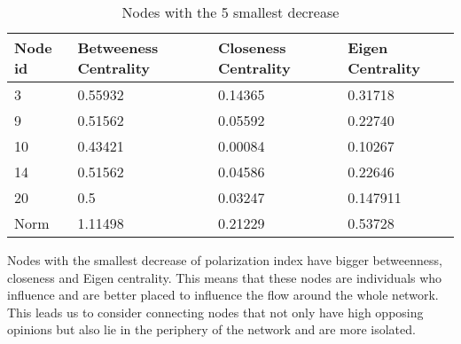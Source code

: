 \begin{table}[t]
 \centering
 \caption{Nodes with the 5 smallest decrease}
 \label{tab:nodesSmallest}
 \begin{tabular}{| l || l | l | l |}
 \hline
  Node id & Betweeness Centrality& Closeness Centrality & Eigen Centrality\\
  \hline
  \hline
  3 & 0.55932 & 0.14365 & 0.31718\\
  \hline
  9 & 0.51562 & 0.05592 & 0.22740\\
  \hline
  10 & 0.43421 & 0.00084 &  0.10267\\
  \hline
  14 & 0.51562 & 0.04586 & 0.22646\\
  \hline
  20 & 0.5 & 0.03247 & 0.147911\\
  \hline
  \hline
    Norm & 1.11498 & 0.21229 & 0.53728\\ 
  \hline
 \end{tabular}
\end{table}


Nodes with the smallest decrease of polarization index have bigger betweenness, closeness and Eigen centrality. This means that these nodes are individuals who influence and are better placed to influence the flow around the whole network. This leads us to consider connecting nodes that not only have high opposing opinions but also lie in the periphery of the network and are more isolated.

